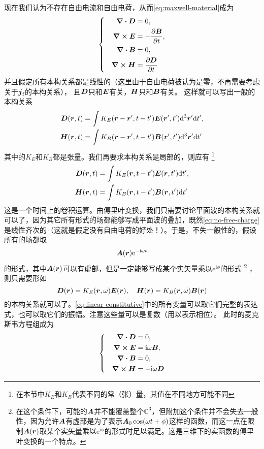 \documentclass[UTF8, a4paper]{ctexart}
\newcommand*{\ii}{\mathrm{i}}
\newcommand*{\ee}{\mathrm{e}}
\newcommand*{\complexes}{\mathbb{C}}
\newenvironment{bigcase}{\left\{\quad\begin{aligned}}{\end{aligned}\right.}
\begin{document}
现在我们认为不存在自由电流和自由电荷，从而\eqref{eq:maxwell-material}成为
\begin{equation}
    \begin{bigcase}
        \div{\vb*{D}} &= 0, \\
        \curl{\vb*{E}} &= - \pdv{\vb*{B}}{t}, \\
        \div{\vb*{B}} &= 0, \\
        \curl{\vb*{H}} &= \pdv{\vb*{D}}{t}
    \end{bigcase}
    \label{eq:no-free-charge}
\end{equation}
并且假定所有本构关系都是线性的（这里由于自由电荷被认为是零，不再需要考虑关于$\vb*{j}_\text{f}$的本构关系），
且$\vb*{D}$只和$\vb*{E}$有关，$\vb*{H}$只和$\vb*{B}$有关。
这样就可以写出一般的本构关系
\[
    \begin{aligned}
        \vb*{D}(\vb*{r}, t) &= \int K_E(\vb*{r} - \vb*{r}', t - t') \vb*{E}(\vb*{r}', t') \dd^3 \vb*{r}' \dd t', \\
        \vb*{H}(\vb*{r}, t) &= \int K_B(\vb*{r} - \vb*{r}', t - t') \vb*{B}(\vb*{r}', t') \dd^3 \vb*{r}' \dd t'
    \end{aligned}
\]
其中的$K_E$和$K_B$都是张量。我们再要求本构关系是局部的，则应有%
\footnote{在本节中$K_E$和$K_B$代表不同的常（张）量，其值在不同地方可能不同}
\[
    \begin{aligned}
        \vb*{D}(\vb*{r}, t) &= \int K_E(\vb*{r}, t-t') \vb*{E}(\vb*{r}, t') \dd t', \\
        \vb*{H}(\vb*{r}, t) &= \int K_B(\vb*{r}, t-t') \vb*{B}(\vb*{r}, t') \dd t'
    \end{aligned}
\]
这是一个时间上的卷积运算。由傅里叶变换，我们只需要讨论平面波的本构关系就可以了，因为其它所有形式的场都能够写成平面波的叠加，既然\eqref{eq:no-free-charge}是线性齐次的（这就是假定没有自由电荷的好处！）。于是，不失一般性的，假设所有的场都取
\[
    \vb*{A}(\vb*{r}) \ee^{-\ii \omega t}
\]
的形式，其中$\vb*{A}(\vb*{r})$可以有虚部，但是一定能够写成某个实矢量乘以$\ee^{\ii \phi}$的形式%
\footnote{在这个条件下，可能的$\vb*{A}$并不能覆盖整个$\complexes^3$，但附加这个条件并不会失去一般性，因为允许$\vb*{A}$有虚部是为了表示$\vb*{A}_0 \cos (\omega t + \phi)$这样的函数，而这一点在限制$\vb*{A}(\vb*{r})$取某个实矢量乘以$\ee^{\ii \phi}$的形式时足以满足。这是三维下的实函数的傅里叶变换的一个特点。}
，则只需要形如
\begin{equation}
    \vb*{D}(\vb*{r}) = K_E(\vb*{r}, \omega) \vb*{E}(\vb*{r}), \quad \vb*{H}(\vb*{r}) = K_B(\vb*{r}, \omega) \vb*{B}(\vb*{r})
    \label{eq:linear-constitutive}
\end{equation}
的本构关系就可以了。\eqref{eq:linear-constitutive}中的所有变量可以取它们完整的表达式，也可以取它们的振幅。注意这些量可以是复数（用以表示相位）。
此时的麦克斯韦方程组成为
\begin{equation}
    \begin{bigcase}
        \div{\vb*{D}} &= 0, \\
        \curl{\vb*{E}} &= \ii \omega \vb*{B}, \\
        \div{\vb*{B}} &= 0, \\
        \curl{\vb*{H}} &= - \ii \omega \vb*{D}
    \end{bigcase}
    \label{eq:sin-wave-eqs}
\end{equation}
\end{document}
